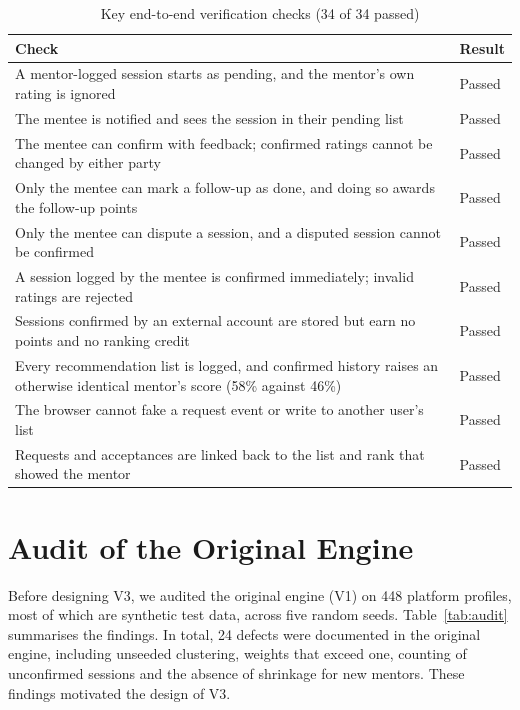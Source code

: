 \documentclass[12pt,a4paper]{report}
\begin{document}
\begin{table}[h]
\centering
\caption{Key end-to-end verification checks (34 of 34 passed)}
\label{tab:checks}
\small
\begin{tabularx}{\textwidth}{X>{\raggedright\arraybackslash}p{2cm}}
\toprule
\textbf{Check} & \textbf{Result}\\
\midrule
A mentor-logged session starts as pending, and the mentor's own rating is ignored & Passed\\
The mentee is notified and sees the session in their pending list & Passed\\
The mentee can confirm with feedback; confirmed ratings cannot be changed by either party & Passed\\
Only the mentee can mark a follow-up as done, and doing so awards the follow-up points & Passed\\
Only the mentee can dispute a session, and a disputed session cannot be confirmed & Passed\\
A session logged by the mentee is confirmed immediately; invalid ratings are rejected & Passed\\
Sessions confirmed by an external account are stored but earn no points and no ranking credit & Passed\\
Every recommendation list is logged, and confirmed history raises an otherwise identical mentor's score (58\% against 46\%) & Passed\\
The browser cannot fake a request event or write to another user's list & Passed\\
Requests and acceptances are linked back to the list and rank that showed the mentor & Passed\\
\bottomrule
\end{tabularx}
\end{table}

\section{Audit of the Original Engine}
Before designing V3, we audited the original engine (V1) on 448 platform profiles, most of which are synthetic test data, across five random seeds. Table~\ref{tab:audit} summarises the findings. In total, 24 defects were documented in the original engine, including unseeded clustering, weights that exceed one, counting of unconfirmed sessions and the absence of shrinkage for new mentors. These findings motivated the design of V3.
\end{document}
